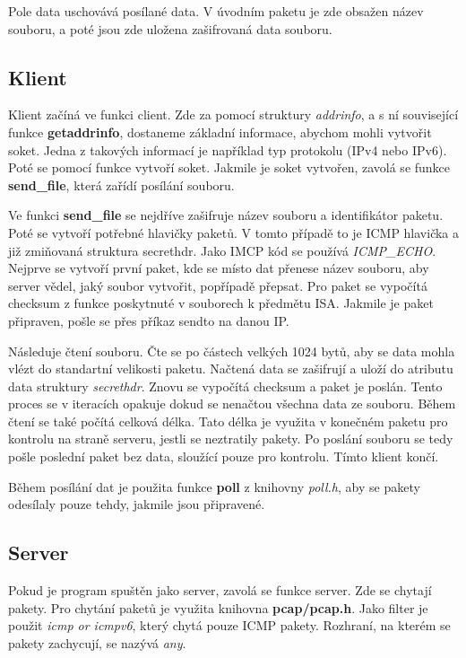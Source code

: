 \documentclass[11pt, a4paper]{article}
\begin{document}
Pole data uschovává posílané data. V úvodním paketu je zde obsažen název souboru, a poté jsou zde uložena zašifrovaná data souboru.

\subsection{Klient}
Klient začíná ve funkci client. Zde za pomocí struktury \emph{addrinfo}, a s ní související funkce \textbf{getaddrinfo}, dostaneme základní informace, abychom mohli vytvořit soket. Jedna z takových informací je například typ protokolu (IPv4 nebo IPv6). Poté se pomocí funkce vytvoří soket. Jakmile je soket vytvořen, zavolá se funkce \textbf{send\_file}, která zařídí posílání souboru.

Ve funkci \textbf{send\_file} se nejdříve zašifruje název souboru a identifikátor paketu. Poté se vytvoří potřebné hlavičky paketů. V tomto případě to je ICMP hlavička a již zmiňovaná struktura secrethdr.
Jako IMCP kód se používá \emph{ICMP\_ECHO}. Nejprve se vytvoří první paket, kde se místo dat přenese název souboru, aby server vědel, jaký soubor vytvořit, popřípadě přepsat. Pro paket se vypočítá checksum z funkce poskytnuté v souborech k předmětu ISA. Jakmile je paket připraven, pošle se přes příkaz sendto na danou IP.

Následuje čtení souboru. Čte se po částech velkých 1024 bytů, aby se data mohla vlézt do standartní velikosti paketu. Načtená data se zašifrují a uloží do atributu data struktury \emph{secrethdr}. Znovu se vypočítá checksum a paket je poslán. Tento proces se v iteracích opakuje dokud se nenačtou všechna data ze souboru. Během čtení se také počítá celková délka. Tato délka je využita v konečném paketu pro kontrolu na straně serveru, jestli se neztratily pakety. Po poslání souboru se tedy pošle poslední paket bez data, sloužící pouze pro kontrolu. Tímto klient končí.

Během posílání dat je použita funkce \textbf{poll} z knihovny \emph{poll.h}, aby se pakety odesílaly pouze tehdy, jakmile jsou připravené.
\subsection{Server}

Pokud je program spuštěn jako server, zavolá se funkce server. Zde se chytají pakety. Pro chytání paketů je využita knihovna \textbf{pcap/pcap.h}. Jako filter je použit \emph{icmp or icmpv6}, který chytá pouze ICMP pakety. Rozhraní, na kterém se pakety zachycují, se nazývá \emph{any}.
\end{document}
